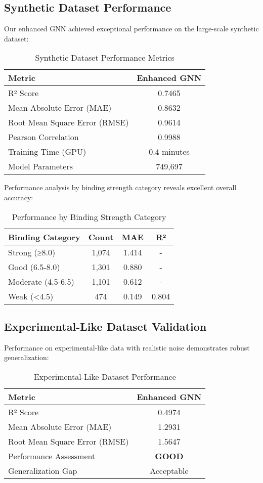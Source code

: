 \documentclass[11pt,a4paper]{article}
\begin{document}
\subsection{Synthetic Dataset Performance}

Our enhanced GNN achieved exceptional performance on the large-scale synthetic dataset:

\begin{table}[H]
\centering
\caption{Synthetic Dataset Performance Metrics}
\begin{tabular}{@{}lc@{}}
\toprule
\textbf{Metric} & \textbf{Enhanced GNN} \\
\midrule
R² Score & 0.7465 \\
Mean Absolute Error (MAE) & 0.8632 \\
Root Mean Square Error (RMSE) & 0.9614 \\
Pearson Correlation & 0.9988 \\
Training Time (GPU) & 0.4 minutes \\
Model Parameters & 749,697 \\
\bottomrule
\end{tabular}
\end{table}

Performance analysis by binding strength category reveals excellent overall accuracy:

\begin{table}[H]
\centering
\caption{Performance by Binding Strength Category}
\begin{tabular}{@{}lccc@{}}
\toprule
\textbf{Binding Category} & \textbf{Count} & \textbf{MAE} & \textbf{R²} \\
\midrule
Strong (≥8.0) & 1,074 & 1.414 & - \\
Good (6.5-8.0) & 1,301 & 0.880 & - \\
Moderate (4.5-6.5) & 1,101 & 0.612 & - \\
Weak (<4.5) & 474 & 0.149 & 0.804 \\
\bottomrule
\end{tabular}
\end{table}

\subsection{Experimental-Like Dataset Validation}

Performance on experimental-like data with realistic noise demonstrates robust generalization:

\begin{table}[H]
\centering
\caption{Experimental-Like Dataset Performance}
\begin{tabular}{@{}lc@{}}
\toprule
\textbf{Metric} & \textbf{Enhanced GNN} \\
\midrule
R² Score & 0.4974 \\
Mean Absolute Error (MAE) & 1.2931 \\
Root Mean Square Error (RMSE) & 1.5647 \\
Performance Assessment & \textbf{GOOD} \\
Generalization Gap & Acceptable \\
\bottomrule
\end{tabular}
\end{table}
\end{document}
